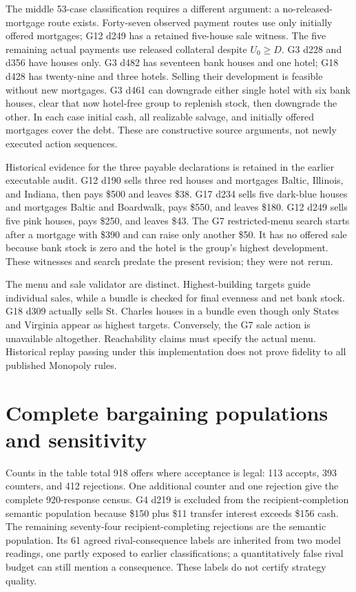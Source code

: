 The middle 53-case classification requires a different argument: a no-released-mortgage route exists. Forty-seven observed payment routes use only initially offered mortgages; G12 d249 has a retained five-house sale witness. The five remaining actual payments use released collateral despite $U_0\geq D$. G3 d228 and d356 have houses only. G3 d482 has seventeen bank houses and one hotel; G18 d428 has twenty-nine and three hotels. Selling their development is feasible without new mortgages. G3 d461 can downgrade either single hotel with six bank houses, clear that now hotel-free group to replenish stock, then downgrade the other. In each case initial cash, all realizable salvage, and initially offered mortgages cover the debt. These are constructive source arguments, not newly executed action sequences.

Historical evidence for the three payable declarations is retained in the earlier executable audit. G12 d190 sells three red houses and mortgages Baltic, Illinois, and Indiana, then pays \$500 and leaves \$38. G17 d234 sells five dark-blue houses and mortgages Baltic and Boardwalk, pays \$550, and leaves \$180. G12 d249 sells five pink houses, pays \$250, and leaves \$43. The G7 restricted-menu search starts after a mortgage with \$390 and can raise only another \$50. It has no offered sale because bank stock is zero and the hotel is the group's highest development. These witnesses and search predate the present revision; they were not rerun.

The menu and sale validator are distinct. Highest-building targets guide individual sales, while a bundle is checked for final evenness and net bank stock. G18 d309 actually sells St. Charles houses in a bundle even though only States and Virginia appear as highest targets. Conversely, the G7 sale action is unavailable altogether. Reachability claims must specify the actual menu. Historical replay passing under this implementation does not prove fidelity to all published Monopoly rules.

\section{Complete bargaining populations and sensitivity}
\label{app:bargaining}


Counts in the table total 918 offers where acceptance is legal: 113 accepts, 393 counters, and 412 rejections. One additional counter and one rejection give the complete 920-response census. G4 d219 is excluded from the recipient-completion semantic population because \$150 plus \$11 transfer interest exceeds \$156 cash. The remaining seventy-four recipient-completing rejections are the semantic population. Its 61 agreed rival-consequence labels are inherited from two model readings, one partly exposed to earlier classifications; a quantitatively false rival budget can still mention a consequence. These labels do not certify strategy quality.

